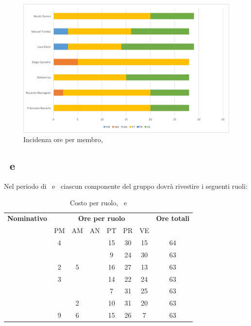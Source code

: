 \begin{figure}[H]
	\centering 
	\includegraphics[scale=0.7]{Immagini/GraficiPianoLavoro/PA.png}
	\caption{Incidenza ore per membro, \PA}
\end{figure}

\newpage
\subsection{\PD\ e \COD}
Nel periodo di \PD\ e \COD\ ciascun componente del gruppo dovrà rivestire i seguenti ruoli:

\begin{table}[h]
	\begin{center}
		\begin{tabular}{|c|c|c|c|c|c|c|c|}
			\hline
			\textbf{Nominativo} & \multicolumn{6}{c|}{\textbf{Ore per ruolo}} & \textbf{Ore totali} \\
					& PM & AM & AN & PT & PR & VE & \\
			\hline
			\FB		& 4  &	  &   & 15	&	30 & 15  &	64	\\
			\hline
			\RM		&	 &	  &	   & 9	&	24 & 30 & 63	\\
			\hline
			\SL		& 2	 & 5  &	   & 16	&	27 & 13  &	63	\\
			\hline
			\DC		& 3	 &	  &	   & 14	&	22 & 24 &	63	\\
			\hline
			\LD 	&	 &	  &	   & 7	&	31 & 25  &	63	\\
			\hline
			\MT		& 	 & 2  &	   & 10	&	31 & 20  &	63	\\
			\hline
			\ND 	& 9 & 6  &	   & 15	&	26 & 7 & 63	\\
			\hline
		\end{tabular}
	\end{center}
	\caption{Costo per ruolo, \PD\ e \COD}
\end{table}

